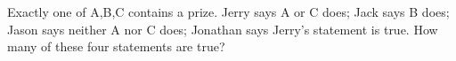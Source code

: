 Exactly one of A,B,C contains a prize. Jerry says A or C does; Jack says B does; Jason says neither A nor C does; Jonathan says Jerry's statement is true. How many of these four statements are true?
